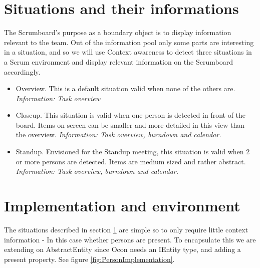 \documentclass[../report.tex]{subfiles}
\begin{document}








\section{Situations and their informations}
\label{sec:proofSituations}

The Scrumboard's purpose as a boundary object is to display information relevant to the team. Out of the information pool only some parts are interesting in a situation, and so we will use Context awareness to detect three situations in a Scrum environment and display relevant information on the Scrumboard accordingly.


\begin{itemize}
\item Overview. This is a default situation valid when none of the others are.
\subitem \textit{Information: Task overview}

\item Closeup. This situation is valid when one person is detected in front of the board. Items on screen can be smaller and more detailed in this view than the overview.
\subitem \textit{Information: Task overview, burndown and calendar.}

\item Standup. Envisioned for the Standup meeting, this situation is valid when 2 or more persons are detected. Items are medium sized and rather abstract.
\subitem \textit{Information: Task overview, burndown and calendar.}
\end{itemize}





\section{Implementation and environment}

The situations described in section \ref{sec:proofSituations} are simple so to only require little context information - In this case whether persons are present. To encapsulate this we are extending on AbstractEntity since Ocon needs an IEntity type, and adding a present property. See figure \ref{fig:PersonImplementation}. 
\end{document}
